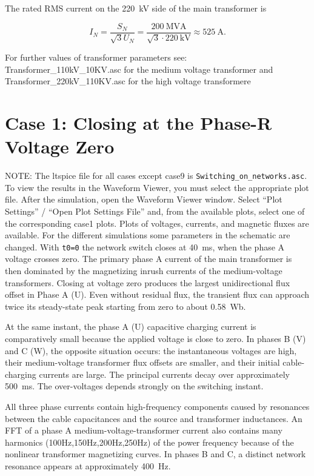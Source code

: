 The rated RMS current on the \SI{220}{\kilo\volt} side of the main transformer
is

\begin{equation}
	I_N=\frac{S_N}{\sqrt{3}U_N}
	=\frac{\SI{200}{\mega\volt\ampere}}
	{\sqrt{3}\cdot\SI{220}{\kilo\volt}}
	\approx\boxed{\SI{525}{\ampere}}.
\end{equation}

\noindent For further values of transformer parameters see: \\
Transformer\_110kV\_10KV.asc for the medium voltage transformer and \\
Transformer\_220kV\_110KV.asc for the high voltage transformere


\section{Case 1: Closing at the Phase-R Voltage Zero} 
\label{sec:network-closing-voltage-zero}

NOTE: The ltspice file for all cases except case9 is \texttt{Switching\_on\_networks.asc}.
To view the results in the Waveform Viewer, you must select the appropriate plot file. After the simulation, open the Waveform Viewer window. Select “Plot Settings” / “Open Plot Settings File” and, from the available plots, select one of the corresponding case1 plots. Plots of voltages, currents, and magnetic fluxes are available.
For the different simulations some parameters in the schematic are changed. 
With \texttt{t0=0} the network switch closes at \SI{40}{\milli\second}, when
the phase A voltage crosses zero. The primary phase A current of the main
transformer is then dominated by the magnetizing inrush currents of the
medium-voltage transformers. Closing at voltage zero produces the largest
unidirectional flux offset in Phase A (U). Even without residual flux, the transient flux can
approach twice its steady-state peak starting from zero to about \SI{0.58}{\weber}.

At the same instant, the phase A (U) capacitive charging current is comparatively
small because the applied voltage is close to zero. In phases B (V) and C (W), the
opposite situation occurs: the instantaneous voltages are high, their medium-voltage
transformer flux offsets are smaller, and their initial cable-charging currents
are large. The principal currents decay over approximately
\SI{500}{\milli\second}. The over-voltages depends strongly on the switching instant. 


All three phase currents contain high-frequency components caused by resonances
between the cable capacitances and the source and transformer inductances. An
FFT of a phase A medium-voltage-transformer current also contains many
harmonics (100Hz,150Hz,200Hz,250Hz) of the power frequency because of the nonlinear transformer
magnetizing curves. In phases B and C, a distinct network resonance appears at
approximately \SI{400}{\hertz}.\\


